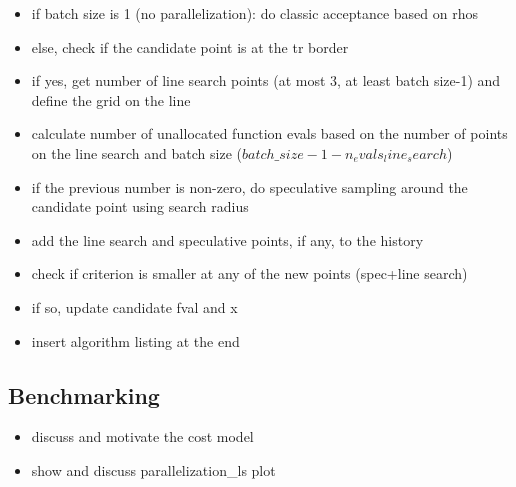 \begin{itemize}
    \item if batch size is 1 (no parallelization): do classic acceptance based on rhos
    \item else, check if the candidate point is at the tr border
    \item if yes, get number of line search points (at most 3, at least batch size-1) and define the
        grid on the line
    \item calculate number of unallocated function evals based on the number of points on the line
        search and batch size ($batch\_size-1-n_evals_line_search$) 
    \item if the previous number is non-zero, do speculative sampling around the candidate point
        using search radius
    \item add the line search and speculative points, if any, to the history
    \item check if criterion is smaller at any of the new points (spec+line search)
    \item if so, update candidate fval and x
    \item insert algorithm listing at the end
\end{itemize}

\subsection{Benchmarking}\label{subsec:parallelization::benchmarking}

\begin{itemize}
    \item discuss and motivate the cost model
    \item show and discuss parallelization\_ls plot
\end{itemize}
